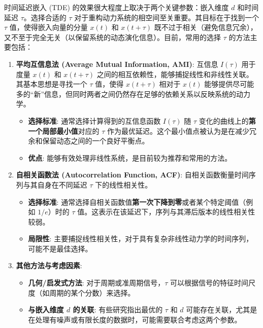 时间延迟嵌入 (TDE) 的效果很大程度上取决于两个关键参数：嵌入维度 $d$ 和时间延迟 $\tau$。选择合适的 $\tau$ 对于重构动力系统的相空间至关重要。其目标在于找到一个 $\tau$ 值，使得嵌入向量的分量 $x(t)$ 和 $x(t+\tau)$ 既不过于相关（避免信息冗余），又不至于完全无关（以保留系统的动态演化信息）。目前，常用的选择 $\tau$ 的方法主要包括：

\begin{enumerate}
    \item \textbf{平均互信息法 (Average Mutual Information, AMI)}:
    互信息 $I(\tau)$ 用于度量 $x(t)$ 和 $x(t+\tau)$ 之间的相互依赖性，能够捕捉线性和非线性关联。其基本思想是寻找一个 $\tau$ 值，使得 $x(t+\tau)$ 相对于 $x(t)$ 能够提供尽可能多的“新”信息，但同时两者之间仍然存在足够的依赖关系以反映系统的动力学。
    \begin{itemize}
        \item \textbf{选择标准}: 通常选择计算得到的互信息函数 $I(\tau)$ 随 $\tau$ 变化的曲线上的\textbf{第一个局部最小值}对应的 $\tau$ 作为最优延迟。这个最小值点被认为是在减少冗余和保留动态之间的一个良好平衡点。
        \item \textbf{优点}: 能够有效处理非线性系统，是目前较为推荐和常用的方法。
    \end{itemize}

    \item \textbf{自相关函数法 (Autocorrelation Function, ACF)}:
    自相关函数衡量时间序列与其自身在不同延迟 $\tau$ 下的线性相关性。
    \begin{itemize}
        \item \textbf{选择标准}: 通常选择自相关函数值\textbf{第一次下降到零}或者某个特定阈值（例如 $1/e$）时的 $\tau$ 值。这表示在该延迟下，序列与其滞后版本的线性相关性较弱。
        \item \textbf{局限性}: 主要捕捉线性相关性，对于具有复杂非线性动力学的时间序列，可能不是最佳选择。
    \end{itemize}

    \item \textbf{其他方法与考虑因素}:
    \begin{itemize}
        \item \textbf{几何/启发式方法}: 对于周期或准周期信号，$\tau$ 可以根据信号的特征时间尺度（如周期的某个分数）来选择。
        \item \textbf{与嵌入维度 $d$ 的关联}: 有些研究指出最优的 $\tau$ 和 $d$ 可能存在关联，尤其是在处理有噪声或有限长度的数据时，可能需要联合考虑这两个参数。
    \end{itemize}
\end{enumerate}

